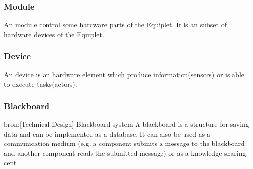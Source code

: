 \documentclass[12pt,a4paper]{report}
\begin{document}
\subsubsection{Module}
An module control some hardware parts of the Equiplet. It is an subset of hardware devices of the Equiplet.
\subsubsection{Device}
An device is an hardware element which produce information(sensors) or is able to execute tasks(actors).
\subsubsection{Blackboard}
bron:[Technical Design] Blackboard system
A blackboard is a structure for saving data and can be implemented as a database. It can also be used as a communication medium (e.g. a component submits a message to the blackboard and another component reads the submitted message) or as a knowledge sharing cent



\end{document}

